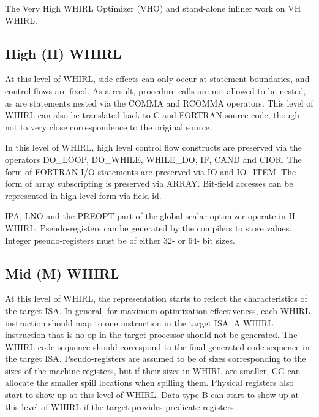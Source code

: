 \documentclass{article}
\begin{document}
The Very High WHIRL Optimizer (VHO) and stand-alone inliner work
on VH WHIRL.

\subsection{High (H) WHIRL}

At this level of WHIRL, side effects can only occur at statement
boundaries, and control flows are fixed. As a result, procedure
calls are not allowed to be nested, as are statements nested via
the
%
COMMA and
%
RCOMMA operators. This level of WHIRL can also be
translated back to C and FORTRAN source code, though not to very
close correspondence to the original source. 

In this level of WHIRL, high level control
flow constructs are preserved via the operators
%
DO\_LOOP,
%
DO\_WHILE,
%
WHILE\_DO,
%
IF,
%
CAND and
%
CIOR. The form of FORTRAN
I/O statements are preserved via
%
IO and
%
IO\_ITEM. The form of array subscripting is preserved via
%
ARRAY. Bit-field accesses can be represented in high-level form via
field-id.

IPA, LNO and the PREOPT part of the global scalar optimizer operate
in H WHIRL. Pseudo-registers can be generated by the compilers to
store values. Integer pseudo-registers must be of either 32- or
64- bit sizes.

\subsection{Mid (M) WHIRL}

At this level of WHIRL, the representation starts to reflect the
characteristics of the target ISA. In general, for maximum
optimization effectiveness, each WHIRL instruction should map to
one instruction in the target ISA. A WHIRL instruction that is no-op
in the target processor should not be generated. The WHIRL code
sequence should correspond to the final generated code sequence in the 
target ISA. Pseudo-registers
are assumed to be of sizes corresponding to the sizes of the
machine registers, but if their sizes in WHIRL are smaller, CG can
allocate the smaller spill locations when spilling them. Physical
registers also start to show up at this level of WHIRL. Data type
B can start to show up at this level of WHIRL if the target provides
predicate registers.
\end{document}
